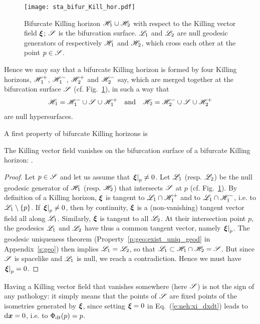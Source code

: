 \begin{figure}
\centerline{\texttt{[image: sta\_bifur\_Kill\_hor.pdf]}}
\caption[]{\label{f:sta:bifur_Kill_hor} \footnotesize
Bifurcate Killing horizon $\mathscr{H}_1\cup\mathscr{H}_2$ with respect to the Killing vector
field $\bm{\xi}$; $\mathscr{S}$ is the bifurcation surface. $\mathscr{L}_1$ and $\mathscr{L}_2$ are
null geodesic generators of respectively $\mathscr{H}_1$ and $\mathscr{H}_2$, which cross
each other at the point $p\in\mathscr{S}$.}
\end{figure}

Hence we may say that a bifurcate Killing horizon is formed by four Killing horizons,
$\mathscr{H}_1^+$, $\mathscr{H}_1^-$, $\mathscr{H}_2^+$ and $\mathscr{H}_2^-$ say,
which are merged together at the bifurcation surface $\mathscr{S}$ (cf. Fig.~\ref{f:sta:bifur_Kill_hor}), in such a way that
\[
    \mathscr{H}_1 = \mathscr{H}_1^- \cup \mathscr{S} \cup \mathscr{H}_1^+ \quad \mbox{and}\quad
    \mathscr{H}_2 = \mathscr{H}_2^- \cup \mathscr{S} \cup \mathscr{H}_2^+
\]
are null hypersurfaces.

A first property of bifurcate Killing horizons is
\begin{prop}
\label{p:sta:xi_S_zero}
The Killing vector field vanishes on the bifurcation surface of
a bifurcate Killing horizon:
\be \label{e:sta:xi_S_zero}
     .
\ee
\end{prop}
\begin{proof}
Let $p\in \mathscr{S}$ and let us assume that $\left.\bm{\xi}\right| _p\not=0$.
Let $\mathscr{L}_1$ (resp. $\mathscr{L}_2$) be the null geodesic generator of $\mathscr{H}_1$
(resp. $\mathscr{H}_2$) that intersects $\mathscr{S}$ at $p$ (cf. Fig.~\ref{f:sta:bifur_Kill_hor}).
By definition of a Killing horizon,
$\bm{\xi}$ is tangent to $\mathscr{L}_1\cap\mathscr{H}_1^+$ and to $\mathscr{L}_1\cap\mathscr{H}_1^-$,
i.e. to $\mathscr{L}_1\setminus\{p\}$.
If $\left.\bm{\xi}\right| _p \not=0$, then by continuity,
$\bm{\xi}$ is a (non-vanishing) tangent vector field all along $\mathscr{L}_1$.
Similarly, $\bm{\xi}$ is tangent to all $\mathscr{L}_2$.
At their intersection point $p$, the geodesics $\mathscr{L}_1$ and $\mathscr{L}_2$ have thus a common tangent
vector, namely $\left.\bm{\xi}\right| _p$.
The geodesic uniqueness theorem (Property~\ref{p:geo:exist_uniq_geod} in Appendix~\ref{s:geo})
then implies $\mathscr{L}_1 = \mathscr{L}_2$, so that
$\mathscr{L}_1 \subset \mathscr{H}_1 \cap \mathscr{H}_2 = \mathscr{S}$. But since $\mathscr{S}$ is spacelike and
$\mathscr{L}_1$ is null, we reach a contradiction. Hence we must have
$\left.\bm{\xi}\right| _p = 0$.
\end{proof}

\begin{remark}
\label{r:sta:zero_Killing}
Having a Killing vector field that vanishes somewhere (here $\mathscr{S}$) is not the sign
of any pathology: it simply means that the points of $\mathscr{S}$ are fixed points of
the isometries generated by $\bm{\xi}$, since
setting $\bm{\xi}=0$ in Eq.~(\ref{e:neh:xi_dxdt}) leads to $\mathrm{d}\bm{x}=0$, i.e.
to $\Phi_{\mathrm{d} t}(p) = p$.
\end{remark}

